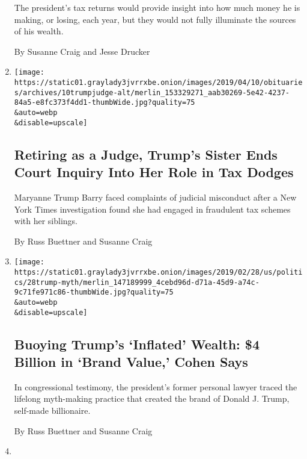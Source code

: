 \begin{enumerate}
  The president's tax returns would provide insight into how much money
  he is making, or losing, each year, but they would not fully
  illuminate the sources of his wealth.

  By Susanne Craig and Jesse Drucker
\item
  \href{/2019/04/10/us/maryanne-trump-barry-misconduct-inquiry.html}{}

  \texttt{[image: https://static01.graylady3jvrrxbe.onion/images/2019/04/10/obituaries/archives/10trumpjudge-alt/merlin\_153329271\_aab30269-5e42-4237-84a5-e8fc373f4dd1-thumbWide.jpg?quality=75\\\&auto=webp\\\&disable=upscale]}

  \hypertarget{retiring-as-a-judge-trumps-sister-ends-court-inquiry-into-her-role-in-tax-dodges}{%
  \subsection{Retiring as a Judge, Trump's Sister Ends Court Inquiry
  Into Her Role in Tax
  Dodges}\label{retiring-as-a-judge-trumps-sister-ends-court-inquiry-into-her-role-in-tax-dodges}}

  Maryanne Trump Barry faced complaints of judicial misconduct after a
  New York Times investigation found she had engaged in fraudulent tax
  schemes with her siblings.

  By Russ Buettner and Susanne Craig
\item
  \href{/2019/02/27/us/politics/donald-trump-wealth.html}{}

  \texttt{[image: https://static01.graylady3jvrrxbe.onion/images/2019/02/28/us/politics/28trump-myth/merlin\_147189999\_4cebd96d-d71a-45d9-a74c-9c71fe971c86-thumbWide.jpg?quality=75\\\&auto=webp\\\&disable=upscale]}

  \hypertarget{buoying-trumps-inflated-wealth-4-billion-in-brand-value-cohen-says}{%
  \subsection{Buoying Trump's `Inflated' Wealth: \$4 Billion in `Brand
  Value,' Cohen
  Says}\label{buoying-trumps-inflated-wealth-4-billion-in-brand-value-cohen-says}}

  In congressional testimony, the president's former personal lawyer
  traced the lifelong myth-making practice that created the brand of
  Donald J. Trump, self-made billionaire.

  By Russ Buettner and Susanne Craig
\item
  \href{/2019/02/02/business/trump-deutsche-bank.html}{}


\end{enumerate}
